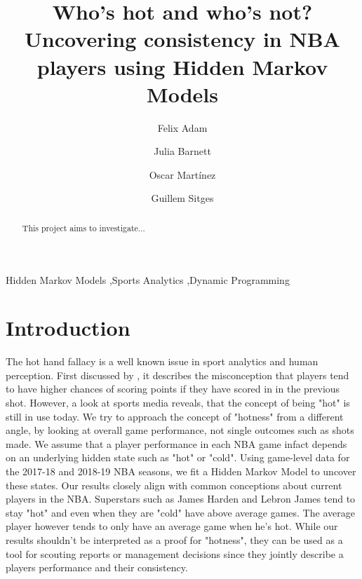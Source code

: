 \documentclass[12pt, authoryear]{elsarticle}
\begin{document}
\begin{frontmatter}  %

\title{Who's hot and who's not? \\  Uncovering consistency in NBA players using Hidden Markov Models}

\author[Add1]{Felix Adam}

\author[Add1]{Julia Barnett}

\author[Add1]{Oscar Martínez}

\author[Add1]{Guillem Sitges}

\address[Add1]{Barcelona Graduate School of Economics, Barcelona, Spain}




\begin{keyword}
\footnotesize{
Hidden Markov Models  \sep Sports Analytics \sep  Dynamic Programming \\ \vspace{0.3cm}
}
\end{keyword}
\vspace{0.5cm}
\end{frontmatter}

\headsep 35pt %
\begin{abstract}
This project aims to investigate...
\end{abstract}

\section{Introduction}

The hot hand fallacy  is a well known issue in sport analytics and human perception. First discussed by \cite{gilovich1985hot}, it describes the misconception that players tend to have higher chances of scoring points if they have scored in in the previous shot. However, a look at sports media reveals, that the concept of being "hot" is still in use today. We try to approach the concept of "hotness" from a different angle, by looking at overall game performance, not single outcomes such as shots made. We assume that a player performance in each NBA game infact depends on an underlying hidden state such as "hot" or "cold". Using game-level data for the 2017-18 and 2018-19 NBA seasons, we fit a Hidden Markov Model to uncover these states. Our results closely align with common conceptions about current players in the NBA. Superstars such as James Harden and Lebron James tend to stay "hot" and even when they are "cold" have above average games. The average player however tends to only have an average game when he's hot. While our results shouldn't be interpreted as a proof for "hotness", they can be used as a tool for scouting reports or management decisions since they jointly describe a players performance and their consistency. 
\end{document}
